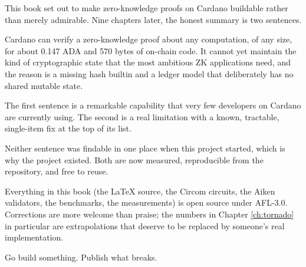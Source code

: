 This book set out to make zero-knowledge proofs on Cardano buildable rather than
merely admirable. Nine chapters later, the honest summary is two sentences.

\begin{outline}
Cardano can verify a zero-knowledge proof about any computation, of any size,
for about 0.147 ADA and 570 bytes of on-chain code. It cannot yet maintain the
kind of cryptographic state that the most ambitious ZK applications need, and
the reason is a missing hash builtin and a ledger model that deliberately has no
shared mutable state.
\end{outline}

The first sentence is a remarkable capability that very few developers on
Cardano are currently using. The second is a real limitation with a known,
tractable, single-item fix at the top of its list.

Neither sentence was findable in one place when this project started, which is
why the project existed. Both are now measured, reproducible from the repository,
and free to reuse.

\begin{highlight}
Everything in this book (the LaTeX source, the Circom circuits, the Aiken
validators, the benchmarks, the measurements) is open source under AFL-3.0.
Corrections are more welcome than praise; the numbers in Chapter
\ref{ch:tornado} in particular are extrapolations that deserve to be replaced by
someone's real implementation.

Go build something. Publish what breaks.
\end{highlight}
